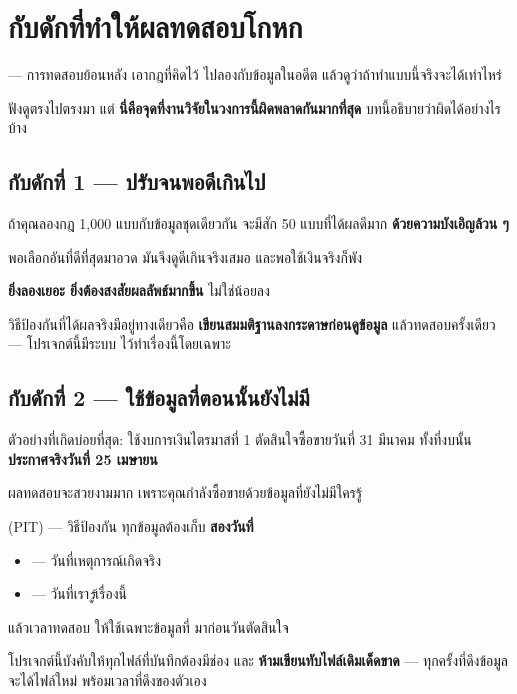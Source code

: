 \documentclass[11pt]{article}
\begin{document}
\section{กับดักที่ทำให้ผลทดสอบโกหก}

\begin{term}{ --- การทดสอบย้อนหลัง}
เอากฎที่คิดไว้ ไปลองกับข้อมูลในอดีต แล้วดูว่าถ้าทำแบบนี้จริงจะได้เท่าไหร่
\end{term}

ฟังดูตรงไปตรงมา แต่ \textbf{นี่คือจุดที่งานวิจัยในวงการนี้ผิดพลาดกันมากที่สุด}
บทนี้อธิบายว่าผิดได้อย่างไรบ้าง

\subsection{กับดักที่ 1 --- ปรับจนพอดีเกินไป}

\begin{trap}{}
ถ้าคุณลองกฎ 1,000 แบบกับข้อมูลชุดเดียวกัน จะมีสัก 50 แบบที่ได้ผลดีมาก
\textbf{ด้วยความบังเอิญล้วน ๆ}

พอเลือกอันที่ดีที่สุดมาอวด มันจึงดูดีเกินจริงเสมอ และพอใช้เงินจริงก็พัง

\textbf{ยิ่งลองเยอะ ยิ่งต้องสงสัยผลลัพธ์มากขึ้น} ไม่ใช่น้อยลง
\end{trap}

วิธีป้องกันที่ได้ผลจริงมีอยู่ทางเดียวคือ \textbf{เขียนสมมติฐานลงกระดาษก่อนดูข้อมูล}
แล้วทดสอบครั้งเดียว --- โปรเจกต์นี้มีระบบ  ไว้ทำเรื่องนี้โดยเฉพาะ

\subsection{กับดักที่ 2 --- ใช้ข้อมูลที่ตอนนั้นยังไม่มี}

\begin{trap}{}
ตัวอย่างที่เกิดบ่อยที่สุด: ใช้งบการเงินไตรมาสที่ 1 ตัดสินใจซื้อขายวันที่
31 มีนาคม ทั้งที่งบนั้น \textbf{ประกาศจริงวันที่ 25 เมษายน}

ผลทดสอบจะสวยงามมาก เพราะคุณกำลังซื้อขายด้วยข้อมูลที่ยังไม่มีใครรู้
\end{trap}

\begin{term}{ (PIT) --- วิธีป้องกัน}
ทุกข้อมูลต้องเก็บ \textbf{สองวันที่}

\begin{itemize}
\item {} --- วันที่เหตุการณ์เกิดจริง
\item {} --- วันที่เรา\emph{รู้}เรื่องนี้
\end{itemize}

แล้วเวลาทดสอบ ให้ใช้เฉพาะข้อมูลที่  มาก่อนวันตัดสินใจ

โปรเจกต์นี้บังคับให้ทุกไฟล์ที่บันทึกต้องมีช่อง 
และ \textbf{ห้ามเขียนทับไฟล์เดิมเด็ดขาด} --- ทุกครั้งที่ดึงข้อมูลจะได้ไฟล์ใหม่
พร้อมเวลาที่ดึงของตัวเอง
\end{term}
\end{document}
